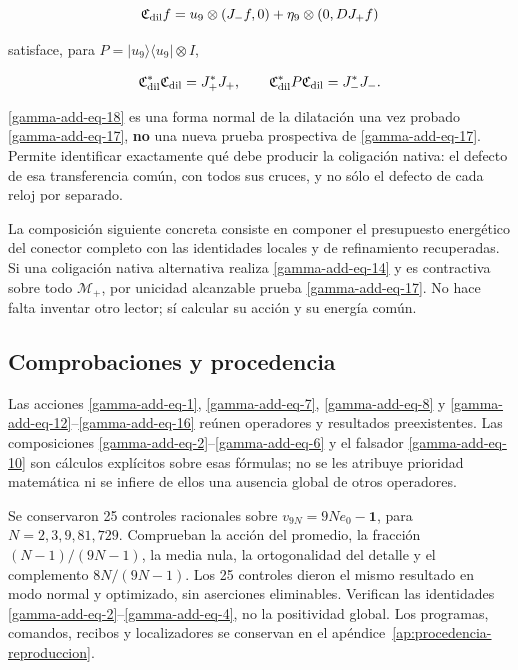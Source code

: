 \begin{equation}
\mathfrak C_{\rm dil}f
=u_9\otimes(J_-f,0)+\eta_9\otimes(0,DJ_+f)
\label{gamma-add-eq-18}
\end{equation}

satisface, para \(P=|u_9\rangle\langle u_9|\otimes I\),

\begin{equation}
\mathfrak C_{\rm dil}^*\mathfrak C_{\rm dil}=J_+^*J_+,\qquad
\mathfrak C_{\rm dil}^*P\mathfrak C_{\rm dil}=J_-^*J_-.
\label{gamma-add-display-37}
\end{equation}

\eqref{gamma-add-eq-18} es una forma normal de la dilatación una vez probado \eqref{gamma-add-eq-17}, \textbf{no} una nueva prueba prospectiva de \eqref{gamma-add-eq-17}. Permite identificar exactamente qué debe producir la coligación nativa: el defecto de esa transferencia común, con todos sus cruces, y no sólo el defecto de cada reloj por separado.

La composición siguiente concreta consiste en componer el presupuesto energético del conector completo con las identidades locales y de refinamiento recuperadas. Si una coligación nativa alternativa realiza \eqref{gamma-add-eq-14} y es contractiva sobre todo \(\mathcal M_+\), por unicidad alcanzable prueba \eqref{gamma-add-eq-17}. No hace falta inventar otro lector; sí calcular su acción y su energía común.

\subsection{Comprobaciones y procedencia}
\label{gamma-add-sub-412}

Las acciones \eqref{gamma-add-eq-1}, \eqref{gamma-add-eq-7},
\eqref{gamma-add-eq-8} y \eqref{gamma-add-eq-12}--\eqref{gamma-add-eq-16}
reúnen operadores y resultados preexistentes. Las composiciones
\eqref{gamma-add-eq-2}--\eqref{gamma-add-eq-6} y el falsador
\eqref{gamma-add-eq-10} son cálculos explícitos sobre esas fórmulas;
no se les atribuye prioridad matemática ni se infiere de ellos una
ausencia global de otros operadores.

Se conservaron 25 controles racionales sobre
\(v_{9N}=9Ne_0-\mathbf1\), para \(N=2,3,9,81,729\).
Comprueban la acción del promedio, la fracción \((N-1)/(9N-1)\),
la media nula, la ortogonalidad del detalle y el complemento
\(8N/(9N-1)\). Los 25 controles dieron el mismo resultado en modo
normal y optimizado, sin aserciones eliminables. Verifican las identidades
\eqref{gamma-add-eq-2}--\eqref{gamma-add-eq-4}, no la positividad global.
Los programas, comandos, recibos y localizadores se conservan en el
apéndice~\ref{ap:procedencia-reproduccion}.

